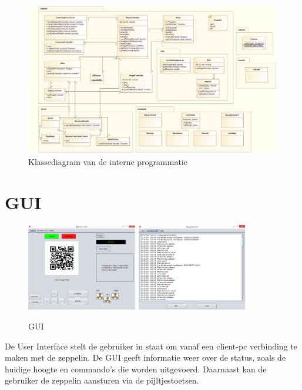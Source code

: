\documentclass[eind]{penoverslag}
\begin{document}
\newpage

\begin{figure}[!ht]
\centering
\includegraphics[scale=0.38,angle=90]{UML.png}
\caption{Klassediagram van de interne programmatie}
\label{UML}
\end{figure}

\section{GUI}
\begin{figure}
\centering
\includegraphics[width=0.43\textwidth]{GUI.png}
\includegraphics[width=0.43\textwidth]{GUI2.png}
\caption{GUI}
\label{GUI}
\end{figure}

De User Interface stelt de gebruiker in staat om vanaf een client-pc verbinding te maken met de zeppelin. De GUI geeft informatie weer over de status, zoals de huidige hoogte en commando's die worden uitgevoerd. Daarnaast kan de gebruiker de zeppelin aansturen via de pijltjestoetsen. \\
\end{document}
